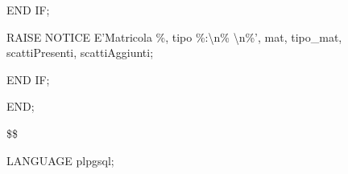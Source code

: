 \begin{flushleft}
\begin{description}
\begin{description}
\begin{description}
\begin{description}
                            \end{description}
                            \item END IF;
                            \vspace{0.5cm}
                            \item RAISE NOTICE E'Matricola \%, tipo \%:\textbackslash{n}\% \textbackslash{n}\%', mat, tipo\_mat, scattiPresenti, scattiAggiunti;
                        \end{description}
                        \item END IF;
                    \end{description}
                    \item END;
                    \item \$\$
                    \item LANGUAGE plpgsql;
                \end{description}
            \end{flushleft}
        \normalfont

\vspace{3cm}

